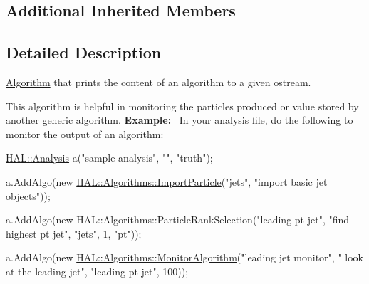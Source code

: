\subsection*{Additional Inherited Members}


\subsection{Detailed Description}
\hyperlink{class_h_a_l_1_1_algorithm}{Algorithm} that prints the content of an algorithm to a given ostream. 

This algorithm is helpful in monitoring the particles produced or value stored by another generic algorithm. {\bfseries Example\+:}~\newline
In your analysis file, do the following to monitor the output of an algorithm\+:


\begin{DoxyCode}
\hyperlink{class_h_a_l_1_1_analysis}{HAL::Analysis} a(\textcolor{stringliteral}{"sample analysis"}, \textcolor{stringliteral}{""}, \textcolor{stringliteral}{"truth"});

a.AddAlgo(\textcolor{keyword}{new} \hyperlink{class_h_a_l_1_1_algorithms_1_1_import_particle}{HAL::Algorithms::ImportParticle}(\textcolor{stringliteral}{"jets"}, \textcolor{stringliteral}{"import basic jet
       objects"}));

a.AddAlgo(\textcolor{keyword}{new} HAL::Algorithms::ParticleRankSelection(\textcolor{stringliteral}{"leading pt jet"}, \textcolor{stringliteral}{"find highest pt jet"}, 
                                                     \textcolor{stringliteral}{"jets"},
                                                     1, \textcolor{stringliteral}{"pt"}));

a.AddAlgo(\textcolor{keyword}{new} \hyperlink{class_h_a_l_1_1_algorithms_1_1_monitor_algorithm}{HAL::Algorithms::MonitorAlgorithm}(\textcolor{stringliteral}{"leading jet monitor"}, \textcolor{stringliteral}{"
      look at the leading jet"}, 
                                                \textcolor{stringliteral}{"leading pt jet"}, 100));
\end{DoxyCode}
 


